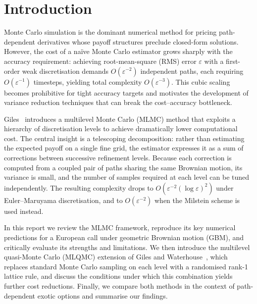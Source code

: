 \documentclass[11pt]{article}
\begin{document}


\section{Introduction}

Monte Carlo simulation is the dominant numerical method for pricing path-dependent derivatives whose payoff structures preclude closed-form solutions. However, the cost of a na\"ive Monte Carlo estimator grows sharply with the accuracy requirement: achieving root-mean-square (RMS) error $\varepsilon$ with a first-order weak discretisation demands $O(\varepsilon^{-2})$ independent paths, each requiring $O(\varepsilon^{-1})$ timesteps, yielding total complexity $O(\varepsilon^{-3})$. This cubic scaling becomes prohibitive for tight accuracy targets and motivates the development of variance reduction techniques that can break the cost--accuracy bottleneck.

Giles~\cite{giles2008} introduces a multilevel Monte Carlo (MLMC) method that exploits a hierarchy of discretisation levels to achieve dramatically lower computational cost. The central insight is a telescoping decomposition: rather than estimating the expected payoff on a single fine grid, the estimator expresses it as a sum of corrections between successive refinement levels. Because each correction is computed from a coupled pair of paths sharing the same Brownian motion, its variance is small, and the number of samples required at each level can be tuned independently. The resulting complexity drops to $O(\varepsilon^{-2}(\log\varepsilon)^{2})$ under Euler--Maruyama discretisation, and to $O(\varepsilon^{-2})$ when the Milstein scheme is used instead.

In this report we review the MLMC framework, reproduce its key numerical predictions for a European call under geometric Brownian motion (GBM), and critically evaluate its strengths and limitations. We then introduce the multilevel quasi-Monte Carlo (MLQMC) extension of Giles and Waterhouse~\cite{giles2009}, which replaces standard Monte Carlo sampling on each level with a randomised rank-1 lattice rule, and discuss the conditions under which this combination yields further cost reductions. Finally, we compare both methods in the context of path-dependent exotic options and summarise our findings.

\end{document}
